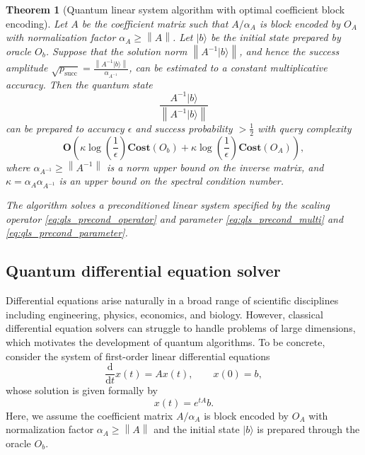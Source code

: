 \documentclass[letterpaper,onecolumn,11pt,accepted=2026-02-14]{quantumarticle}
\newcommand{\norm}[1]{\left\lVert#1\right\rVert}
\newtheorem{theorem}{Theorem}
\theoremstyle{remark}
\theoremstyle{plain}
\newcommand{\eq}[1]{\cref{eq:#1}}
\newcommand{\ket}[1]{|#1\rangle}
\begin{document}
\begin{theorem}[Quantum linear system algorithm with optimal coefficient block encoding]
\label{thm:qls_opt_coeff}
Let $A$ be the coefficient matrix such that $A/\alpha_A$ is block encoded by $O_A$ with normalization factor $\alpha_A\geq\norm{A}$. Let $\ket{b}$ be the initial state prepared by oracle $O_b$.
Suppose that the solution norm $\norm{A^{-1}\ket{b}}$, and hence the success amplitude $\sqrt{p_{\text{succ}}}=\frac{\norm{A^{-1}\ket{b}}}{\alpha_{A^{-1}}}$, can be estimated to a constant multiplicative accuracy.
Then the quantum state 
\begin{equation}
    \frac{A^{-1}\ket{b}}{\norm{A^{-1}\ket{b}}}
\end{equation}
can be prepared to accuracy $\epsilon$ and success probability $>\frac{1}{2}$ with query complexity
\begin{equation}
    \mathbf{O}\left(\kappa\log\left(\frac{1}{\epsilon}\right)\mathbf{Cost}(O_b)
    +\kappa\log\left(\frac{1}{\epsilon}\right)\mathbf{Cost}(O_A)\right),
\end{equation}
where $\alpha_{A^{-1}}\geq\norm{A^{-1}}$ is a norm upper bound on the inverse matrix, and
$\kappa=\alpha_A\alpha_{A^{-1}}$ is an upper bound on the spectral condition number.

The algorithm solves a preconditioned linear system specified by the scaling operator \eq{qls_precond_operator} and parameter \eq{qls_precond_multi} and \eq{qls_precond_parameter}.
\end{theorem}

\subsection{Quantum differential equation solver}
\label{sec:precond_diff_eq}
Differential equations arise naturally in a broad range of scientific disciplines including engineering, physics, economics, and biology. However, classical differential equation solvers can struggle to handle problems of large dimensions, which motivates the development of quantum algorithms. To be concrete, consider the system of first-order linear differential equations
\begin{equation}
    \frac{\mathrm{d}}{\mathrm{d}t}x(t)=Ax(t),\qquad
    x(0)=b,
\end{equation}
whose solution is given formally by
\begin{equation}
    x(t)=e^{tA}b.
\end{equation}
Here, we assume the coefficient matrix $A/\alpha_A$ is block encoded by $O_A$ with normalization factor $\alpha_A\geq\norm{A}$ and the initial state $\ket{b}$ is prepared through the oracle $O_{b}$.
\end{document}
